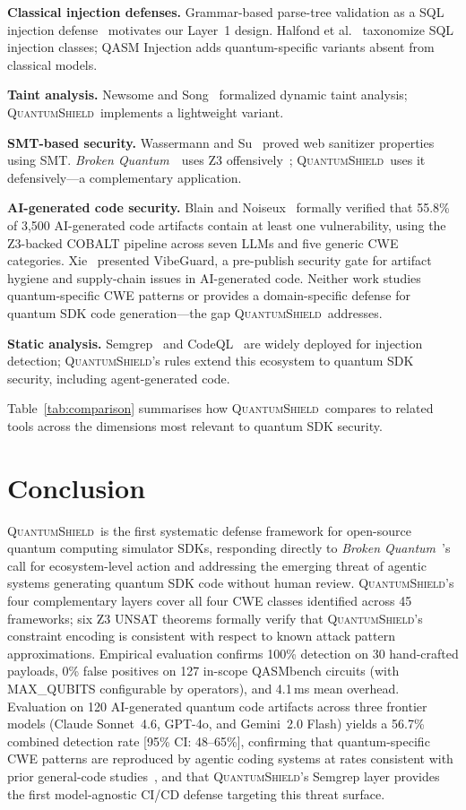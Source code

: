 \documentclass[conference,compsoc]{IEEEtran}
\newcommand{\tool}{\textsc{QuantumShield}}
\newcommand{\broken}{\textit{Broken Quantum}~\cite{blain2026broken}}
\begin{document}
\noindent
\textbf{Classical injection defenses.}
Grammar-based parse-tree validation as a SQL injection
defense~\cite{buehrer2005using} motivates our Layer~1 design.
Halfond et al.~\cite{halfond2006classification} taxonomize SQL
injection classes; QASM Injection adds quantum-specific variants
absent from classical models.

\noindent
\textbf{Taint analysis.}
Newsome and Song~\cite{newsome2005dynamic} formalized dynamic taint
analysis; \tool\ implements a lightweight variant.

\noindent
\textbf{SMT-based security.}
Wassermann and Su~\cite{wassermann2007sound} proved web sanitizer
properties using SMT.
\broken\ uses Z3 offensively~\cite{blain2026broken}; \tool\ uses
it defensively---a complementary application.

\noindent
\textbf{AI-generated code security.}
Blain and Noiseux~\cite{bbd2026} formally verified that 55.8\% of
3,500 AI-generated code artifacts contain at least one vulnerability,
using the Z3-backed COBALT pipeline across seven LLMs and five
generic CWE categories.
Xie~\cite{vibeguard2026} presented VibeGuard, a pre-publish security
gate for artifact hygiene and supply-chain issues in AI-generated code.
Neither work studies quantum-specific CWE patterns or provides a
domain-specific defense for quantum SDK code generation---the gap
\tool\ addresses.

\noindent
\textbf{Static analysis.}
Semgrep~\cite{semgrep2022} and CodeQL~\cite{avgustinov2016ql}
are widely deployed for injection detection; \tool's rules extend
this ecosystem to quantum SDK security, including agent-generated code.


\noindent Table~\ref{tab:comparison} summarises how \tool\ compares to related
tools across the dimensions most relevant to quantum SDK security.

\section{Conclusion}
\label{sec:conclusion}
\noindent\tool\ is the first systematic defense framework for open-source
quantum computing simulator SDKs, responding directly to \broken's
call for ecosystem-level action and addressing the emerging threat
of agentic systems generating quantum SDK code without human review.
\tool's four complementary layers cover all four CWE classes identified
across 45 frameworks; six Z3 UNSAT theorems formally verify that
\tool's constraint encoding is consistent with respect to known attack
pattern approximations.
Empirical evaluation confirms 100\% detection on 30 hand-crafted
payloads, 0\% false positives on 127 in-scope QASMbench circuits
(with MAX\_QUBITS configurable by operators), and 4.1\,ms mean overhead.
Evaluation on 120 AI-generated quantum code artifacts across three
frontier models (Claude Sonnet~4.6, GPT-4o, and Gemini~2.0 Flash)
yields a 56.7\% combined detection rate [95\% CI: 48--65\%],
confirming that quantum-specific CWE patterns are reproduced by
agentic coding systems at rates consistent with prior general-code
studies~\cite{bbd2026}, and that \tool's Semgrep layer provides
the first model-agnostic CI/CD defense targeting this threat surface.
\end{document}
